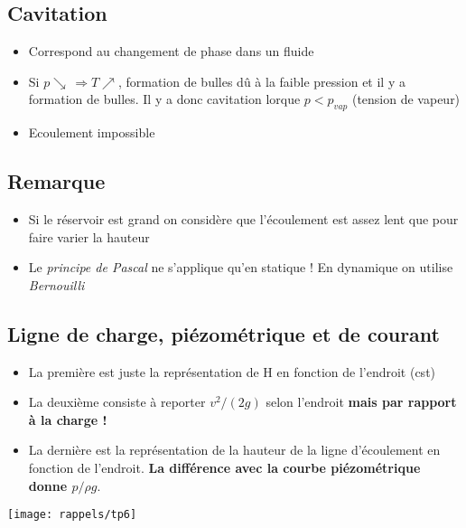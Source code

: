 \subsection*{Cavitation}
\begin{itemize}
	\item Correspond au changement de phase dans un fluide
	\item Si $p \searrow \, \Rightarrow T \nearrow$, formation de bulles dû à la faible pression et il y a formation de bulles. Il y a donc cavitation lorque $p < p_{vap}$ (tension de vapeur)
	\item Ecoulement impossible
\end{itemize}

\subsection*{Remarque}
\begin{itemize}
	\item Si le réservoir est grand on considère que l'écoulement est assez lent que pour faire varier la hauteur
	\item Le \textit{principe de Pascal} ne s'applique qu'en statique ! En dynamique on utilise \textit{Bernouilli}
\end{itemize}

\subsection*{Ligne de charge, piézométrique et de courant}
\begin{itemize}
\item La première est juste la représentation de H en fonction de l'endroit (cst)
\item La deuxième consiste à reporter $v^2/(2 g)$ selon l'endroit \textbf{mais par rapport à la charge !}
\item La dernière est la représentation de la hauteur de la ligne d'écoulement en fonction de l'endroit. \textbf{La différence avec la courbe piézométrique donne $p/\rho g$}.
\end{itemize}
\begin{center}
\texttt{[image: rappels/tp6]}
\end{center}